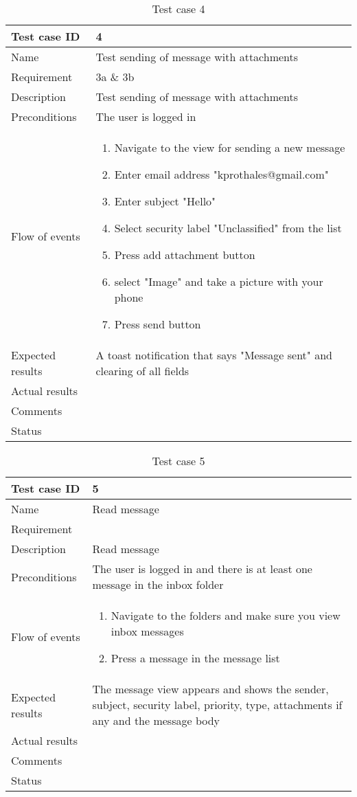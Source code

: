 \begin{table}
\begin{tabular}{l|p{10cm}}
Test case ID & 4 \\ \hline
Name & Test sending of message with attachments\\ \hline
Requirement & 3a \& 3b\\ \hline
Description & Test sending of message with attachments\\ \hline
Preconditions & The user is logged in\\ \hline
Flow of events & 
\begin{enumerate}
\item{}Navigate to the view for sending a new message
\item{}Enter email address "kprothales@gmail.com"
\item{}Enter subject "Hello"
\item{}Select security label "Unclassified" from the list
\item{}Press add attachment button
\item{}select "Image" and take a picture with your phone
\item{}Press send button
\end{enumerate} \\ \hline
Expected results & A toast notification that says "Message sent" and clearing of all fields\\ \hline \hline
Actual results & \\ \hline
Comments & \\ \hline
Status & 
\end{tabular}
\caption{Test case 4} \label{tab:case4}
\end{table}

\begin{table}
\begin{tabular}{l|p{10cm}}
Test case ID & 5 \\ \hline
Name & Read message\\ \hline
Requirement & \\ \hline
Description & Read message\\ \hline
Preconditions & The user is logged in and there is at least one message in the inbox folder\\ \hline
Flow of events & 
\begin{enumerate}
\item{}Navigate to the folders and make sure you view inbox messages
\item{}Press a message in the message list
\end{enumerate} \\ \hline
Expected results & The message view appears and shows the sender, subject, security label, priority, type, attachments if any and the message body\\ \hline \hline
Actual results & \\ \hline
Comments & \\ \hline
Status & 
\end{tabular}
\caption{Test case 5} \label{tab:case5}
\end{table}


